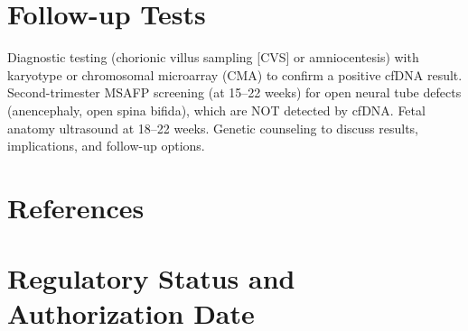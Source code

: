 \section*{Follow-up Tests}
Diagnostic testing (chorionic villus sampling [CVS] or amniocentesis) with karyotype or chromosomal microarray (CMA) to confirm a positive cfDNA result. Second-trimester MSAFP screening (at 15--22 weeks) for open neural tube defects (anencephaly, open spina bifida), which are NOT detected by cfDNA. Fetal anatomy ultrasound at 18--22 weeks. Genetic counseling to discuss results, implications, and follow-up options.

\section*{References}



\clearpage
\section*{Regulatory Status and Authorization Date}

\clearpage
